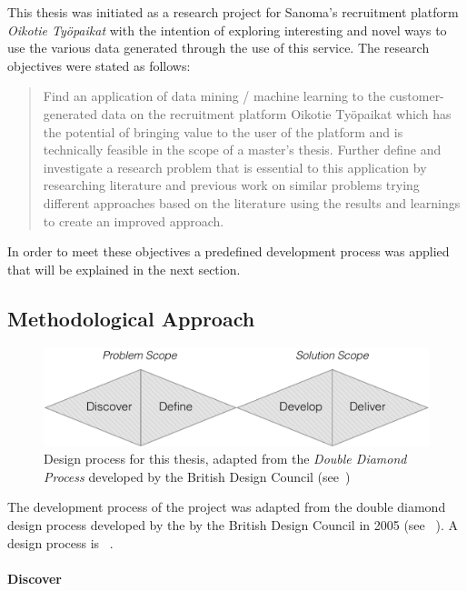 This thesis was initiated as a research project for Sanoma's recruitment platform \emph{Oikotie Työpaikat} with the intention of exploring interesting and novel ways to use the various data generated through the use of this service. The research objectives were stated as follows:

\blockquote{Find an application of data mining / machine learning to the customer-generated data on the recruitment platform Oikotie Työpaikat which has the potential of bringing value to the user of the platform and is technically feasible in the scope of a master’s thesis. Further define and investigate a research problem that is essential to this application by researching literature and previous work on similar problems trying different approaches based on the literature using the results and learnings to create an improved approach.}

In order to meet these objectives a predefined development process was applied that will be explained in the next section.

\subsection{Methodological Approach}
\label{sub:Methodological Approach}

\begin{figure}[h]
    \centering
    \includegraphics[width=\textwidth]{img/double-diamond.pdf}
    \caption{Design process for this thesis, adapted from the \emph{Double Diamond Process} developed by the British Design Council (see~\cite{Council:2007aa})}
\label{fig:double-diamond}
\end{figure}

The development process of the project was adapted from the double diamond design process developed by the by the British Design Council in 2005 (see ~\cite{Council:2007aa}). A design process is ~\cite{Best:2006aa}.

\paragraph{Discover}
\label{par:Discover}


